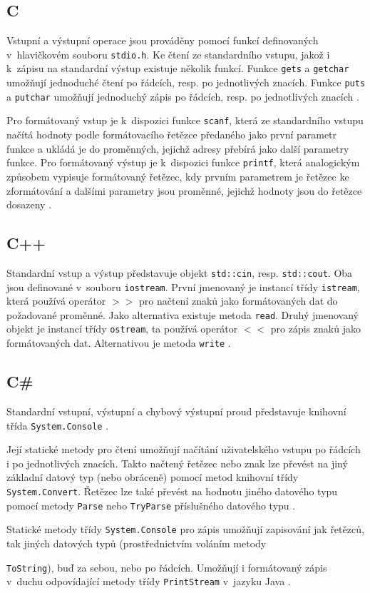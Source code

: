 \documentclass[onepage, a4paper, 12pt]{bakalarka}
\begin{document}
\subsection{C}
Vstupní a výstupní operace jsou prováděny pomocí funkcí definovaných v~hlavičkovém souboru \texttt{stdio.h}. Ke čtení ze standardního vstupu, jakož i k~zápisu na standardní výstup existuje několik funkcí. Funkce \texttt{gets} a \texttt{getchar} umožňují jednoduché čtení po řádcích, resp. po jednotlivých znacích. Funkce \texttt{puts} a \texttt{putchar} umožňují jednoduchý zápis po řádcích, resp. po jednotlivých znacích \cite{cpp-guide-cstdio}.\par
Pro formátovaný vstup je k~dispozici funkce \texttt{scanf}, která ze standardního vstupu načítá hodnoty podle formátovacího řetězce předaného jako první parametr funkce a ukládá je do proměnných, jejichž adresy přebírá jako další parametry funkce. Pro formátovaný výstup je k~dispozici funkce \texttt{printf}, která analogickým způsobem vypisuje formátovaný řetězec, kdy prvním parametrem je řetězec ke zformátování a dalšími parametry jsou proměnné, jejichž hodnoty jsou do řetězce dosazeny \cite{cpp-guide-scanf, cpp-guide-printf}.

\subsection{C++}
Standardní vstup a výstup představuje objekt \texttt{std::cin}, resp. \texttt{std::cout}. Oba jsou definované v~souboru \texttt{iostream}. První jmenovaný je instancí třídy \texttt{istream}, která používá operátor $>>$ pro načtení znaků jako formátovaných dat do požadované proměnné. Jako alternativa existuje metoda \texttt{read}. Druhý jmenovaný objekt je instancí třídy \texttt{ostream}, ta používá operátor $<<$ pro zápis znaků jako formátovaných dat. Alternativou je metoda \texttt{write} \cite{cpp-guide-iostream, cpp-guide-stdcin, cpp-guide-stdcout}.

\subsection{C\#}
Standardní vstupní, výstupní a chybový výstupní proud představuje knihovní třída \texttt{System.Console} \cite{cs-guide-console}.\par 
Její statické metody pro čtení umožňují načítání uživatelského vstupu po řádcích i po jednotlivých znacích. Takto načtený řetězec nebo znak lze převést na jiný základní datový typ (nebo obráceně) pomocí metod knihovní třídy \texttt{System.Convert}. Řetězec lze také převést na hodnotu jiného datového typu pomocí metody \texttt{Parse} nebo \texttt{TryParse} příslušného datového typu \cite{cs-guide-convert, cs-guide-sbyte, cs-guide-short, cs-guide-int, cs-guide-long, cs-guide-float, cs-guide-double, cs-guide-bool, cs-guide-char}.\par
Statické metody třídy \texttt{System.Console} pro zápis umožňují zapisování jak řetězců, tak jiných datových typů (prostřednictvím voláním metody \par\noindent\texttt{ToString}), buď za sebou, nebo po řádcích. Umožňují i formátovaný zápis v~duchu odpovídající metody třídy \texttt{PrintStream} v~jazyku Java \cite{cs-guide-console}.
\end{document}
